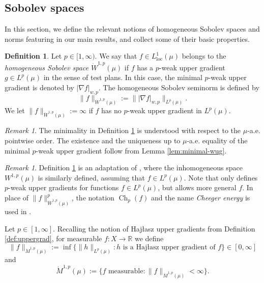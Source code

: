 \documentclass[11pt]{amsart}
\theoremstyle{definition}
\newtheorem{definition}[theorem]{Definition}
\theoremstyle{remark}
\newtheorem{remark}[theorem]{Remark}
\numberwithin{equation}{section}
\newcommand{\abs}[1]{|#1|}
\newcommand{\Norm}[2]{\|#1\|_{#2}}
\begin{document}
\subsection{Sobolev spaces}\label{ss:Sobolev}

In this section, we define the relevant notions of homogeneous Sobolev spaces and norms
featuring in our main results, and collect some of their basic properties.

\begin{definition}\label{def:dotW1p}
Let $p\in[1,\infty)$.
We say that $f\in L^1_{\mathrm{loc}}(\mu)$ belongs to the
\emph{homogeneous Sobolev space
$\dot W^{1,p}(\mu)$} if $f$ has a $p$-weak upper gradient $g\in L^p(\mu)$
in the sense of test plans. In this case, the minimal $p$-weak upper gradient
is denoted by $\abs{\nabla f}_{w,p}$. The homogeneous Sobolev seminorm is defined by
\begin{equation*}
   \Norm{f}{\dot W^{1,p}(\mu)}:=\Norm{\abs{\nabla f}_{w,p}}{L^p(\mu)}.
\end{equation*}
We let $\Norm{f}{\dot W^{1,p}(\mu)}:=\infty$ if $f$ has no $p$-weak upper gradient in
$L^p(\mu)$.
\end{definition}

\begin{remark}
The minimality in Definition \ref{def:dotW1p} is understood with respect to
the $\mu$-a.e. pointwise order. The existence and the uniqueness up to $\mu$-a.e.
equality of the minimal $p$-weak upper gradient follow from Lemma
\ref{lem:minimal-wug}.
\end{remark}

\begin{remark}
Definition \ref{def:dotW1p} is an adaptation of \cite[Definition 2.4 and (2.2)]{DMS}, where
the inhomogeneous space $W^{1,p}(\mu)$ is similarly defined, assuming that $f\in L^p(\mu)$.
Note that \cite[Definition 2.3]{DMS} only defines $p$-weak upper gradients for functions
$f\in L^p(\mu)$, but \cite[Definition 4.8]{AGS:13} allows more general $f$. In place of
$\Norm{f}{\dot W^{1,p}(\mu)}^p$, the notation $\operatorname{Ch}_p(f)$ and the name {\em
Cheeger energy} is used in \cite[(2.2)]{DMS}.
\end{remark}

Let $p\in[1,\infty]$.
Recalling the notion of Haj\l{}asz upper gradients from Definition \ref{def:uppergrad}, for
measurable $f:X\to\mathbb R$ we define
\begin{equation*}
  \Norm{f}{\dot M^{1,p}(\mu)}
  :=\inf\{ \Norm{h}{L^p(\mu)}:h\text{ is a Haj\l{}asz upper gradient of }f\}\in[0,\infty]
\end{equation*}
and
\begin{equation*}
  \dot M^{1,p}(\mu):=\{f\text{ measurable}: \Norm{f}{\dot M^{1,p}(\mu)}<\infty\}.
\end{equation*}
\end{document}
